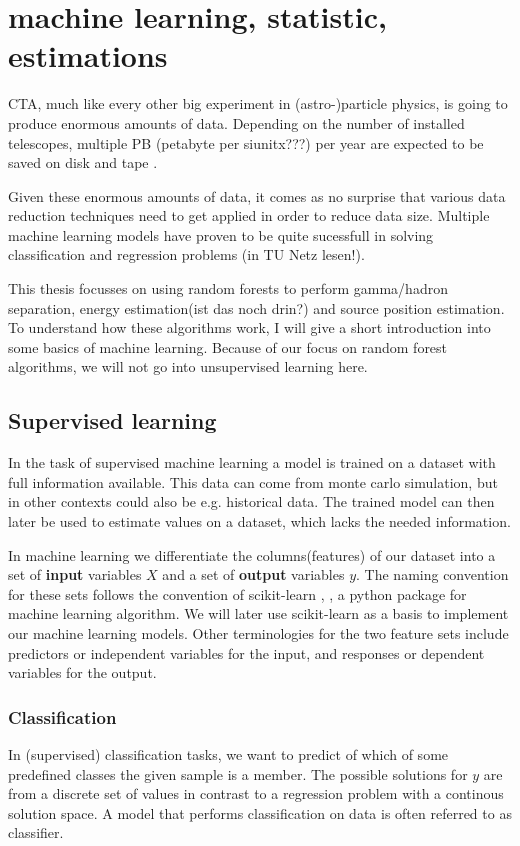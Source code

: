 \chapter{machine learning, statistic, estimations}\label{ml}

CTA, much like every other big experiment in (astro-)particle physics,
is going to produce enormous amounts of data.
Depending on the number of installed telescopes, multiple
PB (petabyte per siunitx???) per year are expected to be saved 
on disk and tape \cite{lamanna2015cherenkov}.

Given these enormous amounts of data, it comes as no surprise that
various data reduction techniques need to get applied in 
order to reduce data size.
Multiple machine learning models have proven to be
quite sucessfull in solving classification and
regression problems 
\cite{doi:10.1142/S0218271810017160}
(in TU Netz lesen!).

This thesis focusses on using random forests to
perform gamma/hadron separation, energy estimation(ist das noch drin?)
and source position estimation.
To understand how these algorithms work, I will
give a short introduction into some basics of machine learning.
Because of our focus on random forest algorithms, we will not 
go into unsupervised learning here.

\section{Supervised learning}
In the task of supervised machine learning a model is trained on a
dataset with full information available.
This data can come from monte carlo simulation, but in other contexts 
could also be e.g. historical data.
The trained model can then later be used to estimate values on a dataset, which
lacks the needed information. 

In machine learning we differentiate
the columns(features) of our dataset into a set of \textbf{input} variables $X$ and
a set of \textbf{output} variables $y$. The naming convention for
these sets follows the convention of scikit-learn
\cite{scikit-learn}, \cite{sklearn_api}, a python package for
machine learning algorithm.
We will later use scikit-learn as a basis to implement our machine learning models.
Other terminologies for the two feature sets include
predictors or independent variables for the input, and
responses or dependent variables for the output.

\subsection{Classification}
In (supervised) classification tasks, we want to predict of which of some 
predefined classes the given sample is a member. The possible solutions for $y$
are from a discrete set of values in 
contrast to a regression problem with a continous solution space.
A model that performs classification on data is often referred to as
classifier.

